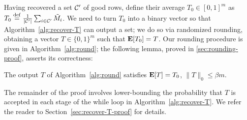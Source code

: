 Having recovered a set $\mathcal{C}'$ of good rows, define their 
average $T_0 \in [0,1]^m$ as $T_0 \stackrel{\rm def}{=} \frac{1}{|\mathcal{C}'|} \sum_{i \in \mathcal{C}'} \tilde{M}_i$. 
We need to turn $T_0$ into a binary vector so that 
Algorithm~\ref{alg:recover-T} can output a set;
we do so via randomized rounding, obtaining a vector $T \in \{0,1\}^m$ such that 
$\mathbf{E}[T_0] = T$.
Our rounding procedure is given in Algorithm~\ref{alg:round}; the following 
lemma, proved in \ref{sec:rounding-proof}, asserts its correctness:
\begin{lemma}
\label{lem:rounding}
The output $T$ of Algorithm~\ref{alg:round} satisfies $\mathbf{E}[T] = T_0$, 
$\|T\|_0 \leq \beta m$.
\end{lemma}



The remainder of the proof involves lower-bounding the probability 
that $T$ is accepted in each stage of the while loop in 
Algorithm~\ref{alg:recover-T}.
We refer the reader to Section~\ref{sec:recover-T-proof} for details.
%
